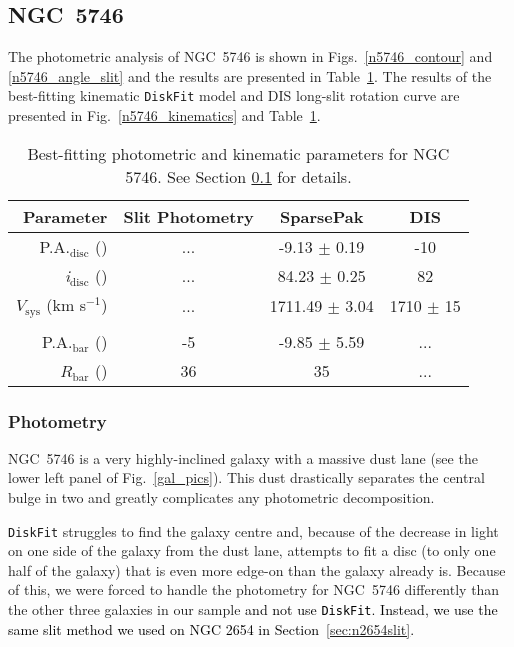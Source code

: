 \documentclass[a4paper,fleqn,usenatbib]{mnras}
\newcommand{\authorfix}{\textcolor{black}}
\begin{document}
\subsection{NGC~5746}
\label{sec:n5746}

The photometric analysis of NGC~5746 is shown in Figs.~\ref{n5746_contour} and \ref{n5746_angle_slit} and the results are presented in Table~\ref{5746_table}. The results of the best-fitting kinematic \texttt{DiskFit} model and DIS long-slit rotation curve are presented in Fig.~\ref{n5746_kinematics} and Table~\ref{5746_table}.    

\begin{table}
	\centering
	\caption{Best-fitting photometric and kinematic parameters for NGC 5746. See Section \ref{sec:n5746} for details.}
	\label{5746_table}
	\begin{tabular}{rccc}
		\hline
		Parameter		& Slit Photometry & SparsePak		&DIS\\
		\hline
	P.A.$_{\mathrm{disc}}$ (\degr) & ... & -9.13 $\pm$ 0.19 &  -10 \\
	\textit{i}$_{\mathrm{disc}}$ (\degr) & ... & 84.23 $\pm$ 0.25 & 82 \\
	$V_{\mathrm{sys}}$ (km s$^{-1}$) & ... & 1711.49 $\pm$ 3.04 & 1710 $\pm$ 15 \\
	\\
	P.A.$_{\mathrm{bar}}$ (\degr) & -5 & -9.85 $\pm$ 5.59 & ... \\
	$R_{\mathrm{bar}}$ (\arcsec) & 36 & 35 & ...\\
	\hline
	\end{tabular}
\end{table}

\subsubsection{Photometry}
\label{sec:n5746phot}

NGC~5746 is a very highly-inclined galaxy with a massive dust lane (see the lower left panel of Fig.~\ref{gal_pics}). This dust drastically separates the central bulge in two and greatly complicates any photometric decomposition.   

\texttt{DiskFit} struggles to find the galaxy centre and, because of the decrease in light on one side of the galaxy from the dust lane, attempts to fit a disc (to only one half of the galaxy) that is even more edge-on than the galaxy already is. Because of this, we were forced to handle the photometry for NGC~5746 differently than the other three galaxies in our sample \authorfix{and not use \texttt{DiskFit}. Instead, we use the same slit method we used on NGC 2654 in Section~\ref{sec:n2654slit}.}
\end{document}
